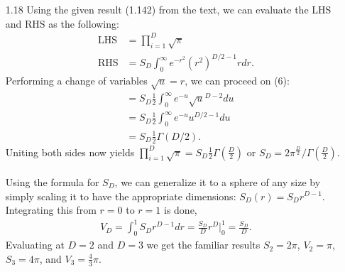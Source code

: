 \documentclass[]{article}
\begin{document}
\begin{enumerate}
 	\item[1.18] Using the given result (1.142) from the text, we can evaluate the LHS and RHS as the following:
 	\begin{align*}
 	\text{LHS} &= \prod_{i=1}^{D}\sqrt{\pi} \\
 	\text{RHS} &= S_D \int_{0}^{\infty} e^{-r^2}(r^2)^{D/2 - 1}r dr. \tag{6}
 	\end{align*}
 	Performing a change of variables $\sqrt{u} = r$, we can proceed on (6):
 	\begin{align*}
 	&= S_D \frac{1}{2} \int_{0}^{\infty} e^{-u}\sqrt{u}^{D-2}du \\
 	&= S_D \frac{1}{2} \int_{0}^{\infty} e^{-u}u^{D/2-1}du \\
 	&= S_D \frac{1}{2}\Gamma(D/2).
 	\end{align*}
 	Uniting both sides now yields $\prod_{i=1}^{D}\sqrt{\pi} = S_D\frac{1}{2}\Gamma(\frac{D}{2})$ or $S_D = 2\pi^\frac{D}{2}/\Gamma(\frac{D}{2})$. \\ \\
 	Using the formula for $S_D$, we can generalize it to a sphere of any size by simply scaling it to have the appropriate dimensions: $S_D(r) = S_Dr^{D-1}$. Integrating this from $r=0$ to $r=1$ is done,
 	\begin{align*}
 	V_D = \int_{0}^{1} S_D r^{D - 1} dr = \frac{S_D}{D}r^D \Big|_0^1 = \frac{S_D}{D}.
 	\end{align*}
 	Evaluating at $D=2$ and $D=3$ we get the familiar results
 	$S_2 = 2 \pi$, $V_2 = \pi$, $S_3 = 4 \pi$, and $V_3 = \frac{4}{3}\pi$.
 	

\end{enumerate}
\end{document}
